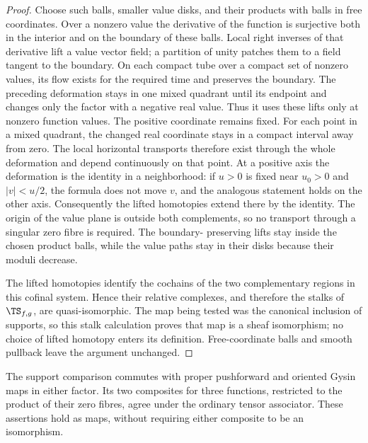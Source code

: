 \begin{proof}
Choose such balls, smaller value disks, and their products with
balls in free coordinates. Over a nonzero value the derivative of
the function is surjective both in the interior and on the boundary
of these balls. Local right inverses of that derivative lift a
value vector field; a partition of unity patches them to a field
tangent to the boundary. On each compact tube over a compact set of
nonzero values, its flow exists for the required time and preserves
the boundary. The preceding deformation stays in one mixed quadrant
until its endpoint and changes only the factor with a negative real
value. Thus it uses these lifts only at nonzero function values.
The positive coordinate remains fixed. For each point in a mixed
quadrant, the changed real coordinate stays in a compact interval
away from zero. The local horizontal transports therefore exist
through the whole deformation and depend continuously on that point.
At a positive axis the deformation is the identity in a neighborhood:
if $u>0$ is fixed near $u_0>0$ and $|v|<u/2$, the formula does not
move $v$, and the analogous statement holds on the other axis.
Consequently the lifted homotopies extend there by the identity.
The origin of the value plane is outside both complements, so no
transport through a singular zero fibre is required. The boundary-
preserving lifts stay inside the chosen product balls, while the
value paths stay in their disks because their moduli decrease.


The lifted homotopies identify the cochains of the two complementary
regions in this cofinal system. Hence their relative complexes, and
therefore the stalks of $\TS_{f,g}$, are quasi-isomorphic.
The map being tested was the canonical inclusion of supports, so
this stalk calculation proves that map is a sheaf isomorphism; no
choice of lifted homotopy enters its definition. Free-coordinate
balls and smooth pullback leave the argument unchanged.
\end{proof}

\begin{proposition}
\label{ts22:prop:coherence}
The support comparison commutes with proper pushforward and oriented
Gysin maps in either factor. Its two composites for three functions,
restricted to the product of their zero fibres, agree under the
ordinary tensor associator. These assertions hold as maps, without
requiring either composite to be an isomorphism.
\end{proposition}

